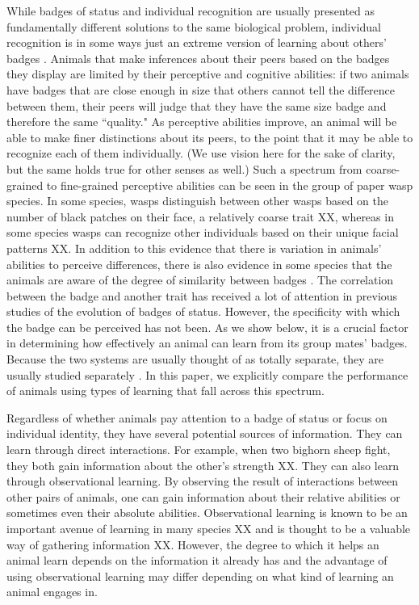 
While badges of status and individual recognition are usually presented as fundamentally different solutions to the same biological problem, individual recognition is in some ways just an extreme version of learning about others' badges \cite{Barnard:1979fk}. Animals that make inferences about their peers based on the badges they display are limited by their perceptive and cognitive abilities: if two animals have badges that are close enough in size that others cannot tell the difference between them, their peers will judge that they have the same size badge and therefore the same ``quality." As perceptive abilities improve, an animal will be able to make finer distinctions about its peers, to the point that it may be able to recognize each of them individually. (We use vision here for the sake of clarity, but the same holds true for other senses as well.) Such a spectrum from coarse-grained to fine-grained perceptive abilities can be seen in the group of paper wasp species. In some species, wasps distinguish between other wasps based on the number of black patches on their face, a relatively coarse trait \cite{Tibbetts:2004kx}XX, whereas in some species wasps can recognize other individuals based on their unique facial patterns XX. In addition to this evidence that there is variation in animals' abilities to perceive differences, there is also evidence in some species that the animals are aware of the degree of similarity between badges \cite{Molelr:1987vn}. The correlation between the badge and another trait has received a lot of attention in previous studies of the evolution of badges of status. However, the specificity with which the badge can be perceived has not been. As we show below, it is a crucial factor in determining how effectively an animal can learn from its group mates' badges. Because the two systems are usually thought of as totally separate, they are usually studied separately \cite{sheehan2016evotradeoff}. In this paper, we explicitly compare the performance of animals using types of learning that fall across this spectrum.

Regardless of whether animals pay attention to a badge of status or focus on individual identity, they have several potential sources of information. They can learn through direct interactions. For example, when two bighorn sheep fight, they both gain information about the other's strength XX. They can also learn through observational learning. By observing the result of interactions between other pairs of animals, one can gain information about their relative abilities or sometimes even their absolute abilities. Observational learning is known to be an important avenue of learning in many species XX and is thought to be a valuable way of gathering information XX. However, the degree to which it helps an animal learn depends on the information it already has and the advantage of using observational learning may differ depending on what kind of learning an animal engages in.

